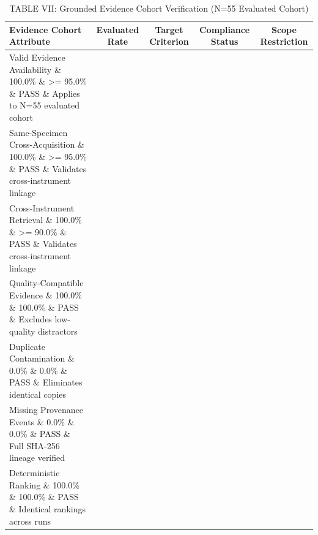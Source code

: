 \begin{table}[t]
\centering
\caption{TABLE VII: Grounded Evidence Cohort Verification (N=55 Evaluated Cohort)}
\label{tab:table7_evidence_cohort}
\begin{tabular}{lcccc}
\hline
\textbf{Evidence Cohort Attribute} & \textbf{Evaluated Rate} & \textbf{Target Criterion} & \textbf{Compliance Status} & \textbf{Scope Restriction} \\
\hline
Valid Evidence Availability \& 100.0\% \& >= 95.0\% \& PASS \& Applies to N=55 evaluated cohort \\
Same-Specimen Cross-Acquisition \& 100.0\% \& >= 95.0\% \& PASS \& Validates cross-instrument linkage \\
Cross-Instrument Retrieval \& 100.0\% \& >= 90.0\% \& PASS \& Validates cross-instrument linkage \\
Quality-Compatible Evidence \& 100.0\% \& 100.0\% \& PASS \& Excludes low-quality distractors \\
Duplicate Contamination \& 0.0\% \& 0.0\% \& PASS \& Eliminates identical copies \\
Missing Provenance Events \& 0.0\% \& 0.0\% \& PASS \& Full SHA-256 lineage verified \\
Deterministic Ranking \& 100.0\% \& 100.0\% \& PASS \& Identical rankings across runs \\
\hline
\end{tabular}
\end{table}
